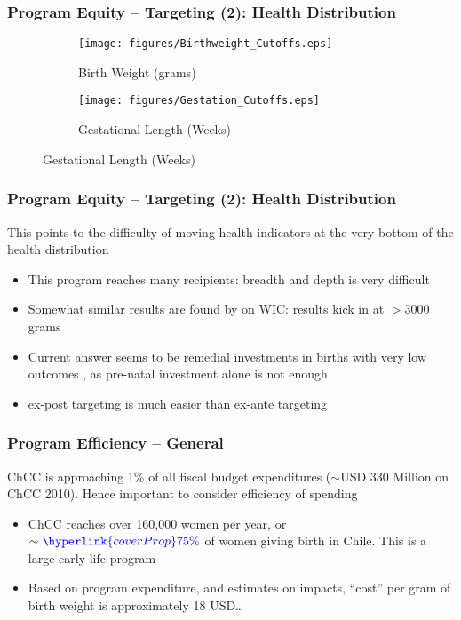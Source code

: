 \documentclass[10pt,letterpaper,subeqn,table]{beamer}
\begin{document}
\begin{frame}[label=equity]
\frametitle{Program Equity -- Targeting (2): Health Distribution}
\begin{figure}[htpb!]
  \begin{center}
    \caption{Policy Impact by Percentile}
    \label{quintiles}
    \begin{subfigure}{.5\textwidth}
      \centering
      \texttt{[image: figures/Birthweight\_Cutoffs.eps]}
      \caption{Birth Weight (grams)}
      \label{quintiles-level}
    \end{subfigure}%
    \begin{subfigure}{.5\textwidth}
      \centering
      \texttt{[image: figures/Gestation\_Cutoffs.eps]}
      \caption{Gestational Length (Weeks)}
      \label{quintiles-log}
    \end{subfigure}
  \end{center}
\end{figure}
\footnotesize{\hyperlink{equity2}{}}
\end{frame}

\begin{frame}
\frametitle{Program Equity -- Targeting (2): Health Distribution}
This points to the difficulty of moving health indicators at the very bottom of the health distribution
\vspace{3mm}
\begin{itemize}
\item This program reaches many recipients: breadth and depth is very difficult
\item Somewhat similar results are found by \citet{RossinSlater2013} on WIC: results kick in at $>$3000 grams
\item Current answer seems to be remedial investments in births with very low outcomes \citep{Bharadwajetal2013}, as pre-natal investment alone is not enough
\item ex-post targeting is much easier than ex-ante targeting
\end{itemize}
\end{frame}



\begin{frame}[label=efficiency]
\frametitle{Program Efficiency -- General}
ChCC is approaching 1\% of all fiscal budget expenditures ($\sim$USD 330 Million on ChCC 2010).  Hence important to consider efficiency of spending \vspace{3mm}
\begin{itemize}
\item ChCC reaches over 160,000 women per year, or $\sim \textcolor{blue}{\hyperlink{coverProp}{75\%}}$ of women giving birth in Chile.  This is a large early-life program
\item Based on program expenditure, and estimates on impacts, ``cost'' per gram of birth weight is approximately 18 USD\ldots
\end{itemize}
\end{frame}
\end{document}
